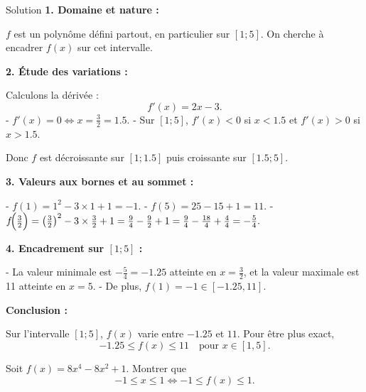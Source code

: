 \documentclass[a4paper,12pt]{article}
\begin{document}
\begin{solutionbox}{Solution}
\textbf{1. Domaine et nature :}

$f$ est un polynôme défini partout, en particulier sur $[1; 5]$. On cherche à encadrer $f(x)$ sur cet intervalle.

\textbf{2. Étude des variations :}

Calculons la dérivée :
$$f'(x) = 2x - 3.$$
- $f'(x) = 0 \Longleftrightarrow x = \frac{3}{2} = 1.5.$  
- Sur $[1; 5]$, $f'(x) < 0$ si $x < 1.5$ et $f'(x) > 0$ si $x > 1.5.$

Donc $f$ est décroissante sur $[1; 1.5]$ puis croissante sur $[1.5; 5].$

\textbf{3. Valeurs aux bornes et au sommet :}

- $f(1) = 1^2 - 3 \times 1 + 1 = -1.$
- $f(5) = 25 - 15 + 1 = 11.$
- $f\!\Bigl(\tfrac{3}{2}\Bigr) = \left(\tfrac{3}{2}\right)^2 - 3 \times \tfrac{3}{2} + 1 = \tfrac{9}{4} - \tfrac{9}{2} + 1 = \tfrac{9}{4} - \tfrac{18}{4} + \tfrac{4}{4} = -\tfrac{5}{4}.$

\textbf{4. Encadrement sur $[1; 5]$ :}

- La valeur minimale est $-\tfrac{5}{4} = -1.25$ atteinte en $x = \tfrac{3}{2}$, et la valeur maximale est 11 atteinte en $x=5.$
- De plus, $f(1) = -1 \in [-1.25, 11].$

\textbf{Conclusion :}

Sur l’intervalle $[1; 5]$, $f(x)$ varie entre $-1.25$ et $11$.  
Pour être plus exact,  
$$ -1.25 \le f(x) \le 11 \quad \text{pour } x \in [1,5].$$
\end{solutionbox}

\begin{exercice}[title=Exercice 21 $\quad \star \star \quad$ {[Calculer, Raisonner]}]
Soit $f(x) = 8x^4 - 8x^2 + 1$. Montrer que
$$
-1 \le x \le 1 \iff -1 \le f(x) \le 1.
$$
\end{exercice}
\end{document}
